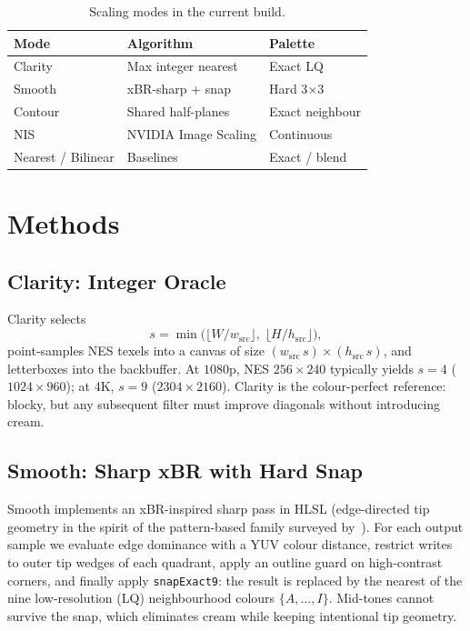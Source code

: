 \documentclass[conference]{IEEEtran}
\begin{document}
\begin{table}[t]
  \caption{Scaling modes in the current build.}
  \label{tab:modes}
  \centering
  \renewcommand{\arraystretch}{1.15}
  \begin{tabular}{@{}p{1.35cm}p{3.1cm}p{2.7cm}@{}}
    \toprule
    \textbf{Mode} & \textbf{Algorithm} & \textbf{Palette} \\
    \midrule
    Clarity & Max integer nearest & Exact LQ \\
    Smooth  & xBR-sharp + snap & Hard 3$\times$3 \\
    Contour & Shared half-planes & Exact neighbour \\
    NIS     & NVIDIA Image Scaling & Continuous \\
    Nearest / Bilinear & Baselines & Exact / blend \\
    \bottomrule
  \end{tabular}
\end{table}

\section{Methods}
\label{sec:methods}

\subsection{Clarity: Integer Oracle}
\label{sec:clarity}
Clarity selects
\begin{equation}
  s = \min\bigl(\lfloor W/w_{\mathrm{src}}\rfloor,\;
                 \lfloor H/h_{\mathrm{src}}\rfloor\bigr),
\end{equation}
point-samples NES texels into a canvas of size
$(w_{\mathrm{src}}\,s)\times(h_{\mathrm{src}}\,s)$, and letterboxes into the
backbuffer. At $1080$p, NES $256{\times}240$ typically yields $s{=}4$
($1024{\times}960$); at $4$K, $s{=}9$ ($2304{\times}2160$). Clarity is the
colour-perfect reference: blocky, but any subsequent filter must improve
diagonals without introducing cream.

\subsection{Smooth: Sharp xBR with Hard Snap}
\label{sec:smooth}
Smooth implements an xBR-inspired sharp pass in HLSL (edge-directed tip
geometry in the spirit of the pattern-based family surveyed
by~\cite{stasik2019pixel}). For each output
sample we evaluate edge dominance with a YUV colour distance, restrict writes
to outer tip wedges of each quadrant, apply an outline guard on high-contrast
corners, and finally apply \texttt{snapExact9}: the result is replaced by the
nearest of the nine low-resolution (LQ) neighbourhood colours
$\{A,\ldots,I\}$. Mid-tones cannot survive the snap, which eliminates cream
while keeping intentional tip geometry.
\end{document}
